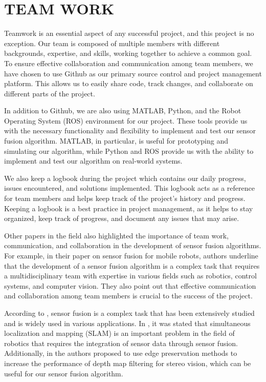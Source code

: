 \documentclass[12pt]{article}
\begin{document}
\section{TEAM WORK}

Teamwork is an essential aspect of any successful project, and this project is no exception. Our team is composed of multiple members with different backgrounds, expertise, and skills, working together to achieve a common goal. To ensure effective collaboration and communication among team members, we have chosen to use Github as our primary source control and project management platform. This allows us to easily share code, track changes, and collaborate on different parts of the project.

In addition to Github, we are also using MATLAB, Python, and the Robot Operating System (ROS) environment for our project. These tools provide us with the necessary functionality and flexibility to implement and test our sensor fusion algorithm. MATLAB, in particular, is useful for prototyping and simulating our algorithm, while Python and ROS provide us with the ability to implement and test our algorithm on real-world systems.

We also keep a logbook during the project which contains our daily progress, issues encountered, and solutions implemented. This logbook acts as a reference for team members and helps keep track of the project's history and progress. Keeping a logbook is a best practice in project management, as it helps to stay organized, keep track of progress, and document any issues that may arise.

Other papers in the field also highlighted the importance of team work, communication, and collaboration in the development of sensor fusion algorithms. For example, in their paper on sensor fusion for mobile robots, authors underline that the development of a sensor fusion algorithm is a complex task that requires a multidisciplinary team with expertise in various fields such as robotics, control systems, and computer vision. They also point out that effective communication and collaboration among team members is crucial to the success of the project.

According to \cite{daniilidis2001sensor}, sensor fusion is a complex task that has been extensively studied and is widely used in various applications. In \cite{durrant2006simultaneous}, it was stated that simultaneous localization and mapping (SLAM) is an important problem in the field of robotics that requires the integration of sensor data through sensor fusion. Additionally, in \cite{silva2020edge} the authors proposed to use edge preservation methods to increase the performance of depth map filtering for stereo vision, which can be useful for our sensor fusion algorithm.
\end{document}
